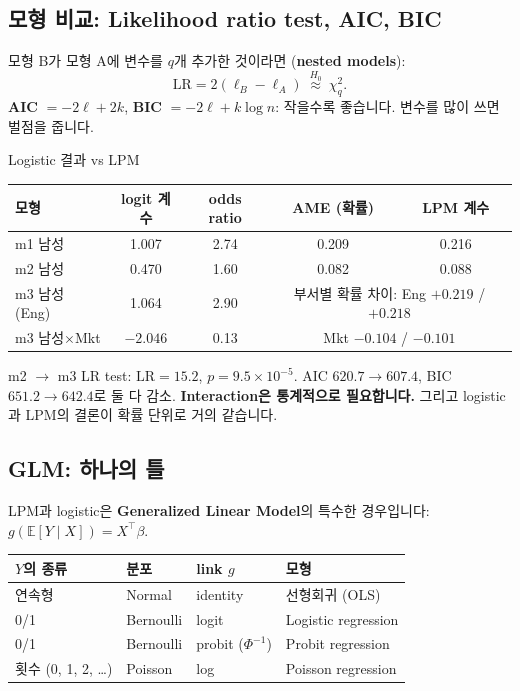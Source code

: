 \documentclass[11pt,a4paper]{article}
\newcommand{\E}{\mathbb{E}}
\newcommand{\term}[1]{\textbf{#1}}
\begin{document}
\subsection{모형 비교: Likelihood ratio test, AIC, BIC}
모형 B가 모형 A에 변수를 $q$개 추가한 것이라면 (\term{nested models}):
\[
\text{LR}=2(\ell_B-\ell_A)\ \overset{H_0}{\approx}\ \chi^2_q.
\]
\term{AIC} $=-2\ell+2k$, \term{BIC} $=-2\ell+k\log n$: 작을수록 좋습니다. 변수를 많이 쓰면 벌점을 줍니다.

\begin{databox}{Logistic 결과 vs LPM}
\begin{center}
\begin{tabular}{@{}l c c c c@{}}
\toprule
모형 & logit 계수 & odds ratio & AME (확률) & LPM 계수 \\
\midrule
m1 남성 & 1.007 & 2.74 & 0.209 & 0.216 \\
m2 남성 & 0.470 & 1.60 & 0.082 & 0.088 \\
m3 남성 (Eng) & 1.064 & 2.90 & \multicolumn{2}{c}{부서별 확률 차이: Eng $+0.219$ / $+0.218$} \\
m3 남성$\times$Mkt & $-2.046$ & 0.13 & \multicolumn{2}{c}{Mkt $-0.104$ / $-0.101$} \\
\bottomrule
\end{tabular}
\end{center}
m2 $\to$ m3 LR test: $\text{LR}=15.2$, $p=9.5\times10^{-5}$. AIC $620.7\to607.4$, BIC $651.2\to642.4$로 둘 다 감소. \textbf{Interaction은 통계적으로 필요합니다.} 그리고 logistic과 LPM의 결론이 확률 단위로 거의 같습니다.
\end{databox}

\subsection{GLM: 하나의 틀}
LPM과 logistic은 \term{Generalized Linear Model}의 특수한 경우입니다: $g(\E[Y\mid X])=X^\top\beta$.
\begin{center}
\begin{tabular}{@{}l l l l@{}}
\toprule
$Y$의 종류 & 분포 & link $g$ & 모형 \\
\midrule
연속형 & Normal & identity & 선형회귀 (OLS) \\
0/1 & Bernoulli & logit & Logistic regression \\
0/1 & Bernoulli & probit ($\Phi^{-1}$) & Probit regression \\
횟수 (0, 1, 2, \dots) & Poisson & log & Poisson regression \\
\bottomrule
\end{tabular}
\end{center}
\end{document}
